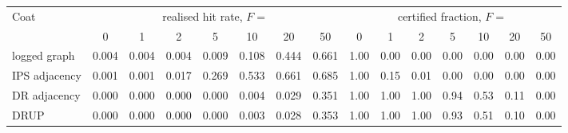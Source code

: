\begin{tabular}{lccccccc|ccccccc}
\toprule
Coat & \multicolumn{7}{c|}{realised hit rate, $F=$} & \multicolumn{7}{c}{certified fraction, $F=$}\\
 & 0 & 1 & 2 & 5 & 10 & 20 & 50 & 0 & 1 & 2 & 5 & 10 & 20 & 50\\
\midrule
logged graph & 0.004 & 0.004 & 0.004 & 0.009 & 0.108 & 0.444 & 0.661 & 1.00 & 0.00 & 0.00 & 0.00 & 0.00 & 0.00 & 0.00\\
IPS adjacency & 0.001 & 0.001 & 0.017 & 0.269 & 0.533 & 0.661 & 0.685 & 1.00 & 0.15 & 0.01 & 0.00 & 0.00 & 0.00 & 0.00\\
DR adjacency & 0.000 & 0.000 & 0.000 & 0.000 & 0.004 & 0.029 & 0.351 & 1.00 & 1.00 & 1.00 & 0.94 & 0.53 & 0.11 & 0.00\\
DRUP & 0.000 & 0.000 & 0.000 & 0.000 & 0.003 & 0.028 & 0.353 & 1.00 & 1.00 & 1.00 & 0.93 & 0.51 & 0.10 & 0.00\\
\bottomrule
\end{tabular}
